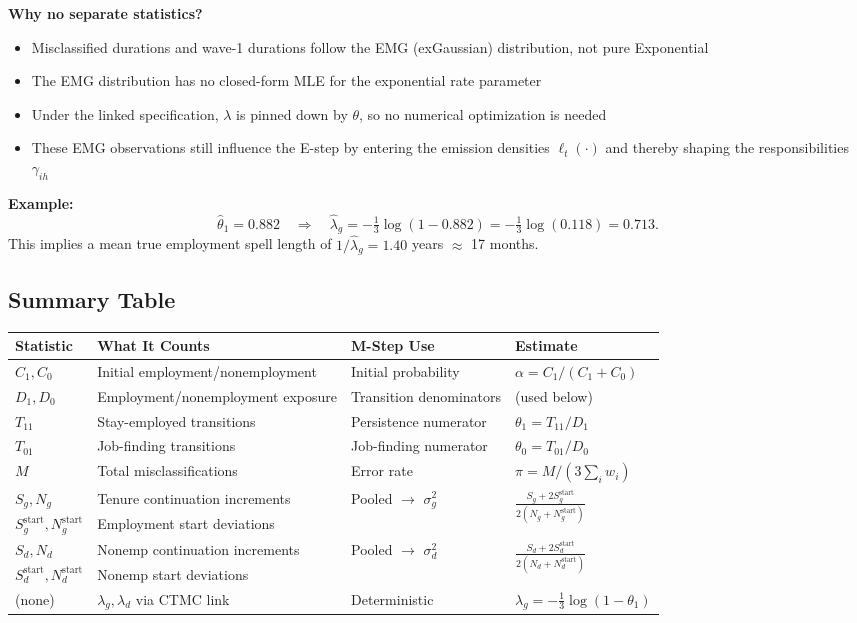 \documentclass[12pt]{article}
\begin{document}
\textbf{Why no separate statistics?}
\begin{itemize}
\item Misclassified durations and wave-1 durations follow the EMG (exGaussian) distribution, not pure Exponential
\item The EMG distribution has no closed-form MLE for the exponential rate parameter
\item Under the linked specification, $\lambda$ is pinned down by $\theta$, so no numerical optimization is needed
\item These EMG observations still influence the E-step by entering the emission densities $\ell_t(\cdot)$ and thereby shaping the responsibilities $\gamma_{ih}$
\end{itemize}

\textbf{Example:}
\[
\hat{\theta}_1 = 0.882 \quad\Rightarrow\quad \hat{\lambda}_g = -\tfrac{1}{3}\log(1-0.882) = -\tfrac{1}{3}\log(0.118) = 0.713.
\]
This implies a mean true employment spell length of $1/\hat{\lambda}_g = 1.40$ years $\approx$ 17 months.

\subsection{Summary Table}

\begin{table}[h]
\centering
\small
\begin{tabular}{llll}
\hline
\textbf{Statistic} & \textbf{What It Counts} & \textbf{M-Step Use} & \textbf{Estimate} \\
\hline
$C_1, C_0$ & Initial employment/nonemployment & Initial probability & $\alpha = C_1/(C_1+C_0)$ \\
$D_1, D_0$ & Employment/nonemployment exposure & Transition denominators & (used below) \\
$T_{11}$ & Stay-employed transitions & Persistence numerator & $\theta_1 = T_{11}/D_1$ \\
$T_{01}$ & Job-finding transitions & Job-finding numerator & $\theta_0 = T_{01}/D_0$ \\
$M$ & Total misclassifications & Error rate & $\pi = M/(3\sum_i w_i)$ \\
$S_g, N_g$ & Tenure continuation increments & \multirow{2}{*}{Pooled $\to$ $\sigma_g^2$} & \multirow{2}{*}{$\frac{S_g+2S_g^{\mathrm{start}}}{2(N_g+N_g^{\mathrm{start}})}$} \\
$S_g^{\mathrm{start}}, N_g^{\mathrm{start}}$ & Employment start deviations & & \\
$S_d, N_d$ & Nonemp continuation increments & \multirow{2}{*}{Pooled $\to$ $\sigma_d^2$} & \multirow{2}{*}{$\frac{S_d+2S_d^{\mathrm{start}}}{2(N_d+N_d^{\mathrm{start}})}$} \\
$S_d^{\mathrm{start}}, N_d^{\mathrm{start}}$ & Nonemp start deviations & & \\
(none) & $\lambda_g,\lambda_d$ via CTMC link & Deterministic & $\lambda_g = -\tfrac{1}{3}\log(1-\theta_1)$ \\
\hline
\end{tabular}
\end{table}
\end{document}
